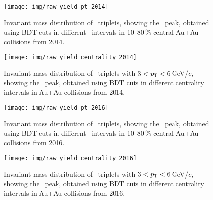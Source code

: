 \begin{figure}[!p]
\vspace{-0.7cm}
\centering
\texttt{[image: img/raw\_yield\_pt\_2014]}
\vspace{-0.5cm}
\caption[Invariant mass distribution of \pKpi\ triplets, showing the \Lambdac\ peak, obtained using BDT cuts in different \pt\ intervals from 2014.]{\label{raw_sig_2014_pt}Invariant mass distribution of \pKpi\ triplets, showing the \Lambdac\ peak, obtained using BDT cuts in different \pt\ intervals in 10--80$\,\%$ central Au+Au collisions from 2014.}
\end{figure}

\begin{figure}[!p]
\centering
\texttt{[image: img/raw\_yield\_centrality\_2014]}
\vspace{-0.5cm}
\caption[Invariant mass distribution of \pKpi\ triplet, showing the \Lambdac\ peak, obtained using BDT cuts in different centrality intervals in Au+Au collisions from 2014.]{\label{raw_sig_2014_centrality}Invariant mass distribution of \pKpi\ triplets with $3 <{p_{\mathrm{T}}} < 6\,$GeV/$c$, showing the \Lambdac\ peak, obtained using BDT cuts in different centrality intervals in Au+Au collisions from 2014.}
\end{figure}

\begin{figure}[!p]
\vspace{-0.7cm}
\centering
\texttt{[image: img/raw\_yield\_pt\_2016]}
\vspace{-0.5cm}
\caption[Invariant mass distribution of \pKpi\ triplets, showing the \Lambdac\ peak, obtained using BDT cuts in different \pt\ intervals from 2016.]{\label{raw_sig_2016_pt}Invariant mass distribution of \pKpi\ triplets, showing the \Lambdac\ peak, obtained using BDT cuts in different \pt\ intervals in 10--80$\,\%$ central Au+Au collisions from 2016.}
\end{figure}

\begin{figure}[!p]
\centering
\texttt{[image: img/raw\_yield\_centrality\_2016]}
\vspace{-0.5cm}
\caption[Invariant mass distribution of \pKpi\ triplet, showing the \Lambdac\ peak, obtained using BDT cuts in different centrality intervals in Au+Au collisions from 2016.]{\label{raw_sig_2016_centrality}Invariant mass distribution of \pKpi\ triplets with $3 <{p_{\mathrm{T}}} < 6\,$GeV/$c$, showing the \Lambdac\ peak, obtained using BDT cuts in different centrality intervals in Au+Au collisions from 2016.}
\end{figure}

